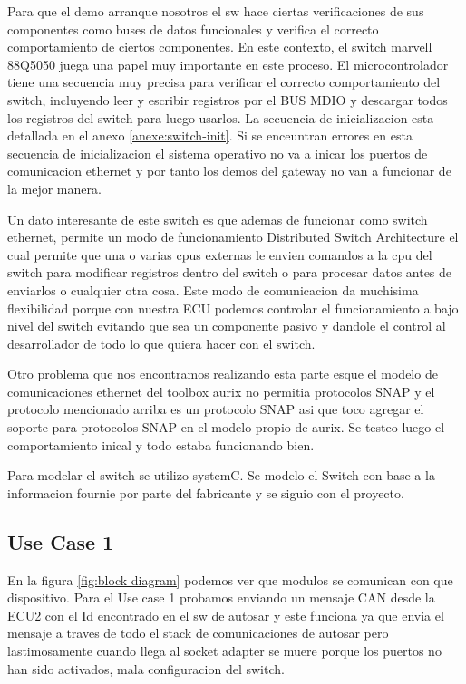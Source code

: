 Para que el demo arranque nosotros el sw hace ciertas verificaciones de sus componentes como buses de datos funcionales y verifica el correcto comportamiento de ciertos componentes. En este contexto, el switch marvell 88Q5050 juega una papel muy importante en este proceso. El microcontrolador tiene una secuencia muy precisa para verificar el correcto comportamiento del switch, incluyendo leer y escribir registros por el BUS MDIO y descargar todos los registros del switch para luego usarlos. La secuencia de inicializacion esta detallada en el anexo \ref{anexe:switch-init}. Si se enceuntran errores en esta secuencia de inicializacion el sistema operativo no va a inicar los puertos de comunicacion ethernet y por tanto los demos del gateway no van a funcionar de la mejor manera.


Un dato interesante de este switch es que ademas de funcionar como switch ethernet, permite un modo de funcionamiento Distributed Switch Architecture el cual permite que una o varias cpus externas le envien comandos a la cpu del switch para modificar registros dentro del switch o para procesar datos antes de enviarlos o cualquier otra cosa. Este modo de comunicacion da muchisima flexibilidad porque con nuestra ECU podemos controlar el funcionamiento a bajo nivel del switch evitando que sea un componente pasivo y dandole el control al desarrollador de todo lo que quiera hacer con el switch.


Otro problema que nos encontramos realizando esta parte esque el modelo de comunicaciones ethernet del toolbox aurix no permitia protocolos SNAP y el protocolo mencionado arriba es un protocolo SNAP asi que toco agregar el soporte para protocolos SNAP en el modelo propio de aurix. Se testeo luego el comportamiento inical y todo estaba funcionando bien.

Para modelar el switch se utilizo systemC. Se modelo el Switch con base a la informacion fournie por parte del fabricante y se siguio con el proyecto.

\subsection{Use Case 1}

En la figura \ref{fig:block diagram} podemos ver que modulos se comunican con que dispositivo. Para el Use case 1 probamos enviando un mensaje CAN desde la ECU2 con el Id encontrado en el sw de autosar y este funciona ya que envia el mensaje a traves de todo el stack de comunicaciones de autosar pero lastimosamente cuando llega al socket adapter se muere porque los puertos no han sido activados, mala configuracion del switch.

